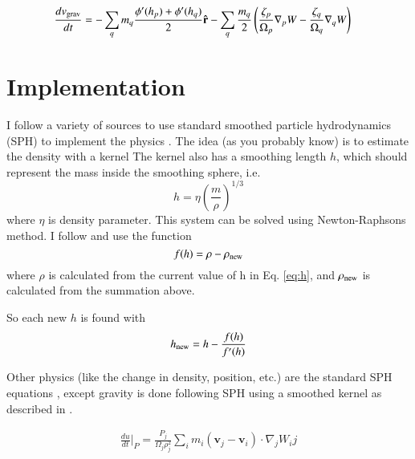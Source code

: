 \documentclass[12pt]{article}
\begin{document}
\begin{align}
    \frac{d v_{\rm grav}}{dt} &= -\sum_q m_q \frac{\phi'(h_p) + \phi'(h_q)}{2}{\bf \hat{r}}
    - \sum_q\frac{m_q}{2} \left( \frac{\zeta_p}{\Omega_p} \nabla_p W - \frac{\zeta_q}{\Omega_q} \nabla_q W \right)
\end{align}



\section{Implementation}
I follow a variety of sources to use standard smoothed particle hydrodynamics (SPH) to implement the physics \citep{monaghan92,monaghan05,PM07,phantom,dwarf,price12,gadget}.
The idea (as you probably know) is to estimate the density with a kernel
The kernel also has a smoothing length $h$, which should represent the mass inside the smoothing sphere, i.e.
\begin{equation} \label{eq:h}
    h = \eta\left(\frac{m}{\rho}\right)^{1/3}
\end{equation}
where $\eta$ is  density parameter. This system can be solved using Newton-Raphsons method. I follow \citet{monaghan05} and use the function 
\begin{equation}
    f(h) = \rho - \rho_{\rm new}
\end{equation}
where $\rho$ is calculated from the current value of h in Eq. \ref{eq:h}, and $\rho_{\rm new}$ is calculated from the summation above.

So each new $h$ is found with
\begin{equation}
    h_{\rm new} = h - \frac{f(h)}{f'(h)}
\end{equation}


Other physics (like the change in density, position, etc.) are the standard SPH equations \citep{monaghan05, monaghan92}, except gravity is done following SPH using a smoothed kernel as described in \citet{PM07}.

\begin{align}
\frac{du}{dt} \Bigg\vert_{P} = \frac{P_j}{\Omega_j\rho_j^2} \sum_i m_i (\mathbf{v}_j - \mathbf{v}_i) \cdot \nabla_j W_ij
\end{align}
\end{document}
